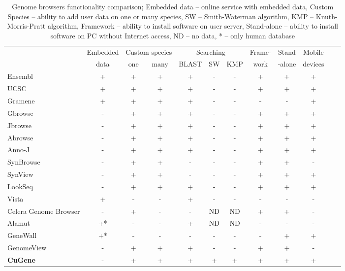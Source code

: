 \documentclass[]{spie}
\newcommand{\appName}{CuGene}
\begin{document}
\begin{table}

  \centering

  \begin{tabular}{|l|c|c|c|c|c|c|c|c|c|p{1cm}|p{1cm}|} \hline
    ~ & Embedded & \multicolumn{2}{|c|}{Custom species}
    & \multicolumn{3}{|c|}{Searching} & Frame- & Stand & Mobile \\
    ~ & data & one & many
    & BLAST & SW & KMP & work & -alone & devices \\ \hline
    Ensembl               & + & + & + &  + & - & - &  + &+ & +  \\ \hline
    UCSC                  & + & + & + &  + & - & - &  + &+ & +  \\ \hline
    Gramene               & + & + & + &  + & - & - &  - &- & +  \\ \hline
    Gbrowse               & - & + & + &  + & - & - &  + &+ & +  \\ \hline
    Jbrowse               & - & + & + &  + & - & - &  + &+ & +  \\ \hline
    Abrowse               & - & + & + &  + & - & - &  + &+ & +  \\ \hline
    Anno-J                & - & + & + &  + & - & - &  + &+ & +  \\ \hline
    SynBrowse             & - & + & + &  - & - & - &  + &+ & -  \\ \hline
    SynView               & - & + & + &  - & - & - &  + &+ & +  \\ \hline
    LookSeq               & - & + & + &  + & - & - &  + &+ & +  \\ \hline
    Vista                 & + & - & - &  + & - & - &  - &- & -  \\ \hline
    Celera Genome Browser & - & + & - &  - & ND& ND&  + &+ & -  \\ \hline
    Alamut                & +*& - & - &  + & ND& ND&  - &- & -  \\ \hline
    GeneWall              & +*& - & - &  - & - & - &  - &+ & +  \\ \hline
    GenomeView            & - & + & + &  + & - & - &  + &+ & -  \\ \hline
    \textbf{\appName{}}   & - & + & + &  + & + & + &  + &+ & +  \\ \hline
  \end{tabular}

  \caption{Genome browsers functionality comparison; Embedded data -- online service with embedded data,
    Custom Species -- ability to add user data on one or many species,
    SW -- Smith-Waterman algorithm, KMP -- Knuth-Morris-Pratt algorithm,
    Framework -- ability to install software on user server, Stand-alone -- ability to install software on PC without Internet access,
    ND -- no data, * -- only human database}
  \label{tab:comparison}

\end{table}
\end{document}
